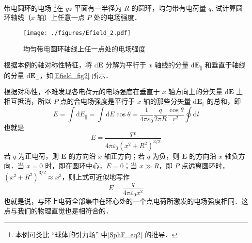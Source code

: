 \begin{example}{带电圆环的电场}\label{Efield_ex2}
\footnote{本例可类比 “球体的引力场” 中\autoref{SphF_eq2} 的推导．}在 $yz$ 平面有一半径为 $R$ 的圆环，均匀带有电荷量 $q$. 试计算圆环轴线（$x$ 轴）上任意一点 $P$ 处的电场强度．
\begin{figure}[ht]
\centering
\texttt{[image: ./figures/Efield\_2.pdf]}
\caption{均匀带电圆环轴线上任一点处的电场强度} \label{Efield_fig2}
\end{figure}

根据本例的轴对称性特征，将 $\mathrm d\mathbf E$ 分解为平行于 $x$ 轴线的分量 $\mathrm d\mathbf E_\parallel$ 和垂直于轴线的分量 $\mathrm d\mathbf E_\perp$，如\autoref{Efield_fig2} 所示．

根据对称性，不难发现各电荷元的电场强度在垂直于 $x$ 轴方向上的分矢量 $\mathrm d\mathbf E$ 上相互抵消，所以 $P$ 点的合电场强度是平行于 $x$ 轴的那些分矢量 $\mathrm d\mathbf E_\parallel$ 的总和，即
\begin{equation}
E=\int \mathrm{d} E_\parallel=\int \mathrm{d} E \cos \theta=\frac{1}{4 \pi \varepsilon_{0}} \frac{q}{2 \pi R} \frac{\cos \theta}{r^{2}} \oint \mathrm{d} l
\end{equation}
也就是
\begin{equation} \label{Efield_eq6}
E=\frac{q x}{4 \pi \varepsilon_{0}\left(x^{2}+R^{2}\right)^{3 / 2}} 
\end{equation}
若 $q$ 为正电荷，则 $\mathbf E$ 的方向沿 $x$ 轴正方向；若 $q$ 为负，则 $\mathbf E$ 的方向沿 $x$ 轴负方向．当 $x=0$ 时，即在圆环中心，$E=0$；当 $x\gg R$，即 $P$ 点远离圆环时，$\left(x^{2}+R^{2}\right)^{3 / 2} \approx x^{3}$，则上式可近似地写作
\begin{equation}
E=\frac{q}{4 \pi \varepsilon_{0} x^{2}}
\end{equation}
也就是说，与环上电荷全部集中在环心处的一个点电荷所激发的电场强度相同．这点与我们的物理直觉也是相符合的．
\end{example}

